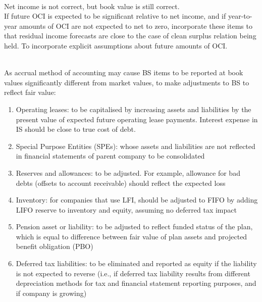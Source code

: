 \begin{remark} \\
Net income is not correct, but book value is still correct.\\
If future OCI is expected to be significant relative to net income, and if year-to-year amounts of OCI are not expected to net to zero, incorporate these items to that residual income forecasts are close to the case of clean surplus relation being held. To incorporate explicit assumptions about future amounts of OCI.
\end{remark}

\begin{remark} \\
As accrual method of accounting may cause BS items to be reported at book values significantly different from market values, to make adjustments to BS to reflect fair value:
\begin{enumerate}[label=\roman*.]
\setlength{\itemsep}{0pt}
\item Operating leases: to be capitalised by increasing assets and liabilities by the present value of expected future operating lease payments. Interest expense in IS should be close to true cost of debt.
\item Special Purpose Entities (SPEs): whose assets and liabilities are not reflected in financial statements of parent company to be consolidated
\item Reserves and allowances: to be adjusted. For example, allowance for bad debts (offsets to account receivable) should reflect the expected loss
\item Inventory: for companies that use LFI, should be adjusted to FIFO by adding LIFO reserve to inventory and equity, assuming no deferred tax impact
\item Pension asset or liability: to be adjusted to reflect funded status of the plan, which is equal to difference between fair value of plan assets and projected benefit obligation (PBO)
\item Deferred tax liabilities: to be eliminated and reported as equity if the liability is not expected to reverse (i.e., if deferred tax liability results from different depreciation methods for tax and financial statement reporting purposes, and if company is growing)
\end{enumerate}
\end{remark}

